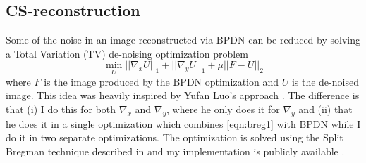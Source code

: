 \documentclass[twocolumn,twoside]{IEEEtran/IEEEtran}
\begin{document}
\subsection{CS-reconstruction}\label{sec:tv_denoise}
Some of the noise in an image reconstructed via BPDN can be reduced by solving a
Total Variation (TV) de-noising optimization problem
\begin{equation}
  \min_{U} ||\nabla_xU||_1 + ||\nabla_yU||_1 + \mu||F - U||_2 \label{eqn:breg1}
\end{equation}
where $F$ is the image produced by the BPDN optimization and $U$ is the
de-noised image. This idea was heavily inspired by Yufan Luo's approach
\cite{luo_mupath_2019}. The difference is that (i) I do this for both $\nabla_x$
and $\nabla_y$, where he only does it for $\nabla_y$ and (ii) that he does it in
a single optimization which combines \eqref{eqn:breg1} with BPDN while I do it
in two separate optimizations. The optimization is solved using the Split
Bregman technique described in \cite{goldstein_splitbregman_2009} and my
implementation is publicly available \cite{L1c}.
\end{document}
